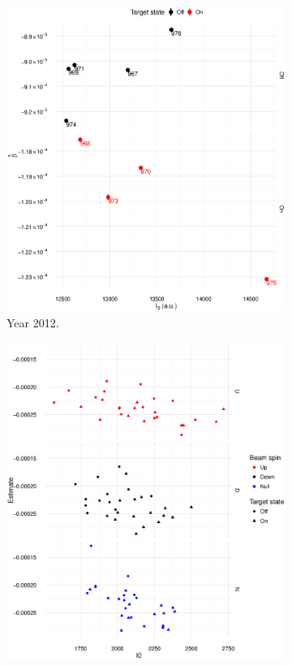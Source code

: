 \documentclass[reprint]{revtex4-1}
\newcommand{\scl}{.4}
\begin{document}
\begin{figure}
\begin{subfigure}{.5\textwidth}
\includegraphics[scale=\scl]{img/Slope_VS_IniCurrent.eps}
\caption{Year 2012.}
\end{subfigure}
\begin{subfigure}{.5\textwidth}
\includegraphics[scale=\scl]{img/Slope_VS_IniCurrent_2016.eps}

\end{subfigure}
\end{figure}
\end{document}
